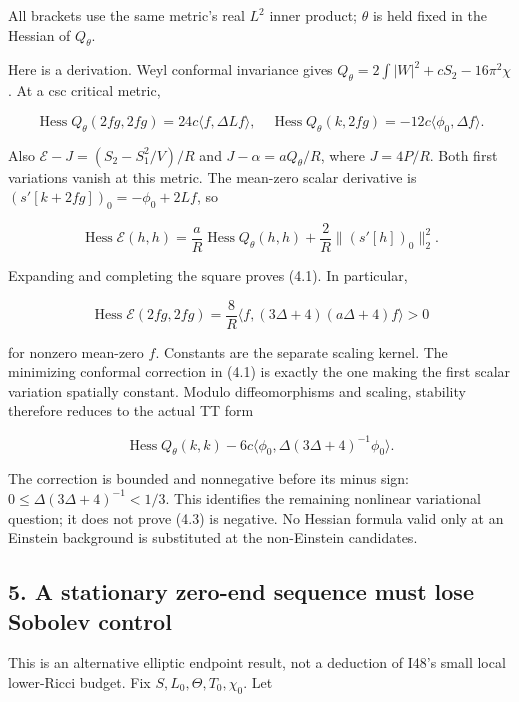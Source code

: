 \documentclass[
  10pt,
]{article}
\begin{document}
All brackets use the same metric's real \(L^2\) inner product;
\(\theta\) is held fixed in the Hessian of \(Q_\theta\).

Here is a derivation. Weyl conformal invariance gives
\(Q_\theta=2\int|W|^2+cS_2-16\pi^2\chi\). At a csc critical metric,

\[
 \operatorname{Hess}Q_\theta(2fg,2fg)=24c\langle f,\Delta Lf\rangle,
 \quad
 \operatorname{Hess}Q_\theta(k,2fg)=-12c\langle\phi_0,\Delta f\rangle.
\]

Also \(\mathcal E-J=(S_2-S_1^2/V)/R\) and \(J-\alpha=aQ_\theta/R\),
where \(J=4P/R\). Both first variations vanish at this metric. The
mean-zero scalar derivative is \((s'[k+2fg])_0=-\phi_0+2Lf\), so

\[
 \operatorname{Hess}\mathcal E(h,h)
  =\frac aR\operatorname{Hess}Q_\theta(h,h)
                  +\frac2R\|(s'[h])_0\|_2^2.
\]

Expanding and completing the square proves (4.1). In particular,

\[
 \operatorname{Hess}\mathcal E(2fg,2fg)
      =\frac8R\langle f,(3\Delta+4)(a\Delta+4)f\rangle>0       \tag{4.2}
\]

for nonzero mean-zero \(f\). Constants are the separate scaling kernel.
The minimizing conformal correction in (4.1) is exactly the one making
the first scalar variation spatially constant. Modulo diffeomorphisms
and scaling, stability therefore reduces to the actual TT form

\[
 \operatorname{Hess}Q_\theta(k,k)
            -6c\langle\phi_0,\Delta(3\Delta+4)^{-1}\phi_0\rangle. \tag{4.3}
\]

The correction is bounded and nonnegative before its minus sign:
\(0\le\Delta(3\Delta+4)^{-1}<1/3\). This identifies the remaining
nonlinear variational question; it does not prove (4.3) is negative. No
Hessian formula valid only at an Einstein background is substituted at
the non-Einstein candidates.

\hypertarget{a-stationary-zero-end-sequence-must-lose-sobolev-control}{%
\subsection{5. A stationary zero-end sequence must lose Sobolev
control}\label{a-stationary-zero-end-sequence-must-lose-sobolev-control}}

This is an alternative elliptic endpoint result, not a deduction of
I48's small local lower-Ricci budget. Fix \(S,L_0,\Theta,T_0,\chi_0\).
Let
\end{document}
